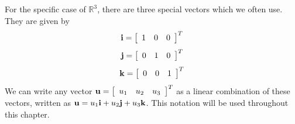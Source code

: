 For the specific case of $\mathbb{R}^3$, there are three special vectors which we often use. 
They are given by 
\begin{equation*}
\mathbf{i} = 
\left[
\begin{array}{rrr}
1 & 0 & 0
\end{array}
\right]^T
\end{equation*}
\begin{equation*}
\mathbf{j} = 
\left[
\begin{array}{rrr}
0 & 1 & 0
\end{array}
\right]^T
\end{equation*}
\begin{equation*}
\mathbf{k} = 
\left[
\begin{array}{rrr}
0 & 0 & 1
\end{array}
\right]^T
\end{equation*}
We can write any vector $\mathbf{u} = 
\left[
\begin{array}{rrr}
u_1 & u_2 & u_3
\end{array}
\right]^T$
as a linear combination of these vectors, written as $\mathbf{u} = u_1 \mathbf{i} + u_2 \mathbf{j} + u_3 \mathbf{k}$. This notation will be used throughout 
this chapter.
